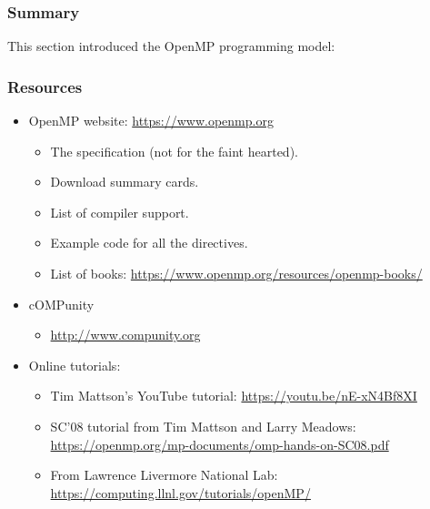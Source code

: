 \documentclass{beamer}
\begin{document}
\begin{frame}
\frametitle{Summary}
This section introduced the OpenMP programming model:
\end{frame}

\begin{frame}
\frametitle{Resources}
\begin{itemize}
\item OpenMP website: \url{https://www.openmp.org}
  \begin{itemize}
    \item The specification (not for the faint hearted).
    \item Download summary cards.
    \item List of compiler support.
    \item Example code for all the directives.
    \item List of books: \url{https://www.openmp.org/resources/openmp-books/}
  \end{itemize}

\item cOMPunity
  \begin{itemize}
    \item \url{http://www.compunity.org}
  \end{itemize}

\item Online tutorials:
  \begin{itemize}
    \item Tim Mattson's YouTube tutorial: \url{https://youtu.be/nE-xN4Bf8XI}
    \item SC'08 tutorial from Tim Mattson and Larry Meadows: \url{https://openmp.org/mp-documents/omp-hands-on-SC08.pdf}
    \item From Lawrence Livermore National Lab: \url{https://computing.llnl.gov/tutorials/openMP/}
  \end{itemize}

\end{itemize}

\end{frame}

\end{document}
